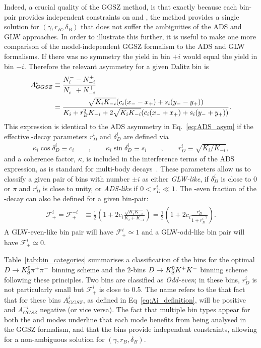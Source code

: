 Indeed, a crucial quality of the GGSZ method, is that exactly because each bin-pair provides independent constraints on \xpm and \ypm, the method provides a single solution for $(\gamma, r_B, \delta_B)$ that does not suffer the ambiguities of the ADS and GLW approaches. In order to illustrate this further, it is useful to make one more comparison of the model-independent GGSZ formalism to the ADS and GLW formalisms. If there was no \CP symmetry the \Bp yield in bin $+i$ would equal the \Bm yield in bin $-i$. Therefore the relevant \CP asymmetry for a given Dalitz bin is
\begin{align}
\begin{split}\label{eq:Ai_definition}
        A_{GGSZ}^i &\equiv \frac{N^-_i - N^+_{-i}}{N^-_i + N^+_{-i}} \\
    &= \frac{\sqrt{K_i K_{-i}}(c_i(x_--x_+)+s_i(y_--y_+))}{K_i+r_B^2K_{-i} + 2 \sqrt{K_i K_{-i}}(c_i(x_-+x_+)+s_i(y_-+y_+))}.
\end{split}
\end{align}
This expression is identical to the ADS asymmetry in Eq.~\eqref{eq:ADS_asym} if the effective \D-decay parameters $r_D^i$ and $\delta_D^i$ are defined via
\begin{align}
    \kappa_i\cos\delta_D^i \equiv c_i \qquad, \qquad \kappa_i\sin \delta_D^i \equiv s_i \qquad, \qquad r_D^i \equiv \sqrt{K_i/K_{-i}},
\end{align}
and a coherence factor, $\kappa$, is included in the interference terms of the ADS expression, as is standard for multi-body \D decays~\cite{gronauImprovingBoundsGamma2003}. These parameters allow us to classify a given pair of bins with number $\pm i$ as either \emph{GLW-like}, if $ \delta_D^i$ is close to $0$ or $\pi$ and $r_D^i$  is close to unity, or \emph{ADS-like} if $0<r_D^i \ll 1$. The \CP-even fraction of the \D-decay can also be defined for a given bin-pair:
\begin{align}
\begin{split}
    \mathcal F_{+}^i = \mathcal F_+^{-i} &\equiv \frac{1}{2}\left(1 + 2c_i \frac{\sqrt{K_i K_{-i}}}{K_i + K_{-i}}\right) = \frac{1}{2}\left(1 + 2c_i \frac{r_D^i}{1+{r_D^i}^2}\right).
\end{split}
\end{align}
A GLW-even-like bin pair will have $\mathcal F_{+}^i\simeq 1$ and a GLW-odd-like bin pair will have $\mathcal F_{+}^i\simeq 0$.

Table~\ref{tab:bin_categories} summarises a classification of the bins for the optimal $D\rightarrow{\ensuremath{{K}^0_{\mathrm{S}}}}{\ensuremath{{\pi}^+}}{\ensuremath{{\pi}^-}}$ binning scheme and the 2-bins ${{D}\rightarrow{\ensuremath{{K}^0_{\mathrm{S}}}}{\ensuremath{{K}^+}}{\ensuremath{{K}^-}}}$ binning scheme following these principles. Two bins are classified as \emph{Odd-even}; in these bins, $r_D^i$ is not particularly small but $\mathcal F_+^i$ is close to 0.5. The name refers to the that fact that for these bins $A_{GGSZ}^i$, as defined in Eq~\eqref{eq:Ai_definition}, will be positive and $A_{GGSZ}^{-i}$ negative (or vice versa). The fact that multiple bin types appear for both the \DtoKspipi and \DtoKsKK modes underline that each mode benefits from being analysed in the GGSZ formalism, and that the bins provide independent constraints, allowing for a non-ambiguous solution for $(\gamma, r_B, \delta_B)$. 

